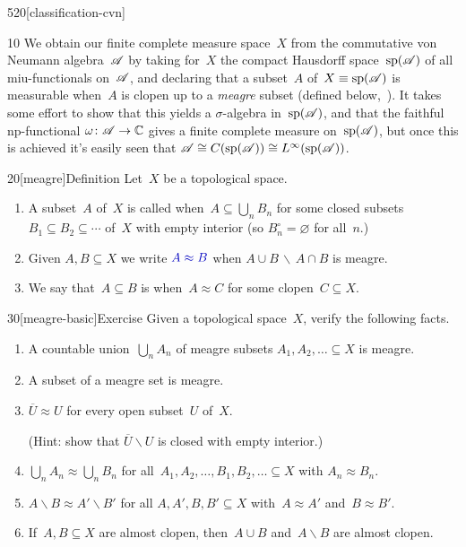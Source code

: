 \begin{parsec}{520}[classification-cvn]
\begin{point}{10}
We obtain our finite complete measure space~$X$
from the commutative von Neumann algebra~$\mathscr{A}$
by taking for~$X$ the compact Hausdorff space~$\mathrm{sp}(\mathscr{A})$
of all miu-functionals on~$\mathscr{A}$,
and declaring that a subset~$A$ of~$X\equiv \mathrm{sp}(\mathscr{A})$ 
is measurable when~$A$ is clopen up to
a \emph{meagre}
subset
(defined below,~).
It takes some effort to show
that this yields a $\sigma$-algebra
in~$\mathrm{sp}(\mathscr{A})$,
and that the faithful np-functional $\omega\colon\mathscr{A}\to \mathbb{C}$
gives a finite complete measure on~$\mathrm{sp}(\mathscr{A})$,
but once this is achieved
it's easily seen that
$\mathscr{A}\cong C(\mathrm{sp}(\mathscr{A}))\cong L^\infty(\mathrm{sp}(\mathscr{A}))$.
\end{point}
\begin{point}{20}[meagre]{Definition}%
Let~$X$ be a topological space.
\begin{enumerate}
\item
A subset~$A$ of~$X$
is called %
when~$A\subseteq \bigcup_n B_n$
for some closed subsets $B_1\subseteq B_2\subseteq \dotsb$
of~$X$ with empty interior (so  $B_n^\circ=\varnothing$
for all~$n$.)
\item
Given $A,B\subseteq X$ 
we write $\Define{A\approx B}$
 when
$A\cup B\,\backslash\,A\cap B$
is meagre.
\item
We say that~$A\subseteq B$
is %
when~$A\approx C$
for some clopen~$C\subseteq X$.
\end{enumerate}
\end{point}
\begin{point}{30}[meagre-basic]{Exercise}%
Given a topological space~$X$,
verify the following facts.
\begin{enumerate}
\item
A countable union~$\bigcup_n A_n$
of meagre subsets $A_1,A_2,\dotsc\subseteq X $ is meagre.
\item
A subset of a meagre set is meagre.
\item
$\overline{U}\approx U$
for every open subset~$U$ of~$X$.

(Hint: show that $\overline{U}\backslash U$
is closed with empty interior.)
\item
$\bigcup_n A_n\approx \bigcup_n B_n$
for all~$A_1,A_2,\dotsc, B_1,B_2,\dotsc\subseteq X$
with $A_n\approx B_n$.
\item
$A\backslash B \approx A'\backslash B'$
for all $A,A',B,B'\subseteq X$
with~$A\approx A'$ and~$B\approx B'$.
\item
If~$A,B\subseteq X$ are almost clopen,
then~$A\cup B$ and~$A\backslash B$ 
are almost clopen.
\end{enumerate}
\end{point}
\end{parsec}
